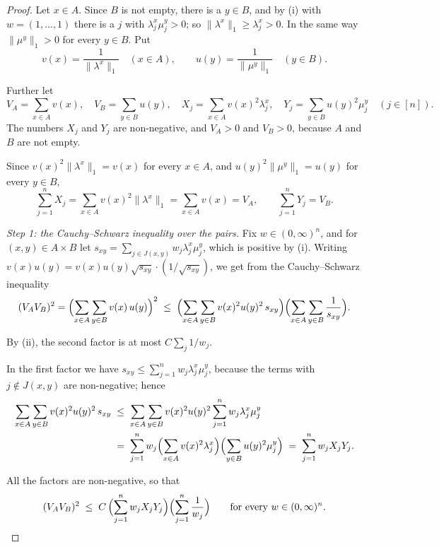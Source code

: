 \documentclass[11pt,reqno]{amsart}
\theoremstyle{definition}
\theoremstyle{remark}
\numberwithin{equation}{section}
\theoremstyle{named}
\theoremstyle{plain}
\newcommand{\norm}[1]{\lVert #1\rVert_1}
\begin{document}
\begin{proof}
Let $x\in A$. Since $B$ is not empty, there is a $y\in B$, and by (i) with $w=(1,\dots,1)$ there is
a $j$ with $\lambda^{x}_j\mu^{y}_j>0$; so $\norm{\lambda^{x}}\ge\lambda^{x}_j>0$. In the same way
$\norm{\mu^{y}}>0$ for every $y\in B$. Put
\[
   v(x)=\frac1{\norm{\lambda^{x}}}\quad(x\in A),\qquad u(y)=\frac1{\norm{\mu^{y}}}\quad(y\in B).
\]

Further let
\[
   V_{A}=\sum_{x\in A}v(x),\quad V_{B}=\sum_{y\in B}u(y),\quad
   X_j=\sum_{x\in A}v(x)^{2}\lambda^{x}_j,\quad Y_j=\sum_{y\in B}u(y)^{2}\mu^{y}_j
   \quad(j\in[n]).
\]
The numbers $X_j$ and $Y_j$ are non-negative, and $V_{A}>0$ and $V_{B}>0$, because $A$ and $B$ are
not empty.

Since $v(x)^{2}\norm{\lambda^{x}}=v(x)$ for every $x\in A$, and
$u(y)^{2}\norm{\mu^{y}}=u(y)$ for every $y\in B$,
\begin{equation}\label{eq:XY}
   \sum_{j=1}^{n}X_j=\sum_{x\in A}v(x)^{2}\norm{\lambda^{x}}=\sum_{x\in A}v(x)=V_{A},\qquad
   \sum_{j=1}^{n}Y_j=V_{B}.
\end{equation}

\smallskip
\emph{Step 1: the Cauchy--Schwarz inequality over the pairs.} Fix $w\in(0,\infty)^{n}$, and for
$(x,y)\in A\times B$ let $s_{xy}=\sum_{j\in J(x,y)}w_j\lambda^{x}_j\mu^{y}_j$, which is
positive by (i). Writing
$v(x)u(y)=v(x)u(y)\sqrt{s_{xy}}\cdot(1/\sqrt{s_{xy}})$, we get from the Cauchy--Schwarz inequality
\[
   (V_{A}V_{B})^{2}=\Bigl(\sum_{x\in A}\sum_{y\in B}v(x)\,u(y)\Bigr)^{2}
   \;\le\;\Bigl(\sum_{x\in A}\sum_{y\in B}v(x)^{2}u(y)^{2}\,s_{xy}\Bigr)
   \Bigl(\sum_{x\in A}\sum_{y\in B}\frac1{s_{xy}}\Bigr).
\]

By (ii), the second factor is at most $C\sum_j1/w_j$.

In the first factor we have
$s_{xy}\le\sum_{j=1}^{n}w_j\lambda^{x}_j\mu^{y}_j$, because the terms with $j\notin J(x,y)$
are non-negative; hence
\begin{align*}
   \sum_{x\in A}\sum_{y\in B}v(x)^{2}u(y)^{2}\,s_{xy}
   &\;\le\;\sum_{x\in A}\sum_{y\in B}v(x)^{2}u(y)^{2}\sum_{j=1}^{n}w_j\lambda^{x}_j\mu^{y}_j\\
   &\;=\;\sum_{j=1}^{n}w_j\Bigl(\sum_{x\in A}v(x)^{2}\lambda^{x}_j\Bigr)
                 \Bigl(\sum_{y\in B}u(y)^{2}\mu^{y}_j\Bigr)\;=\;\sum_{j=1}^{n}w_jX_jY_j .
\end{align*}

All the factors are non-negative, so that
\begin{equation}\label{eq:allw}
   (V_{A}V_{B})^{2}\;\le\;C\,\Bigl(\sum_{j=1}^{n}w_jX_jY_j\Bigr)\Bigl(\sum_{j=1}^{n}\frac1{w_j}\Bigr)
   \qquad\text{for every }w\in(0,\infty)^{n}.
\end{equation}


\end{proof}
\end{document}
